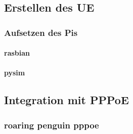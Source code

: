 	\subsection{Erstellen des UE}
		\subsubsection{Aufsetzen des Pis}
			\paragraph{rasbian}
			\paragraph{pysim}
	\subsection{Integration mit PPPoE}
		 \subsubsection{roaring penguin pppoe}

\clearpage
